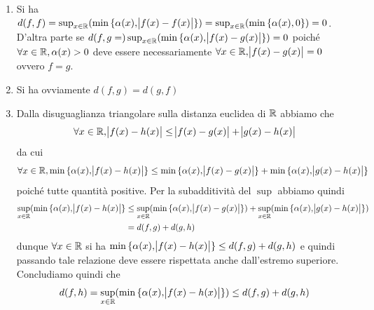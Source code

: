 \documentclass[a4paper]{article}\par \usepackage{style}\par
\begin{document}
\begin{enumerate}[label = (\roman*)]
\item Si ha $ d(f, f) = \sup_{x \in \mathbb{R}}(\min{\{\alpha(x), \abs{f(x) - f(x)}\}}) = \sup_{x \in \mathbb{R}}(\min{\{\alpha(x), 0\}}) = 0 $. D'altra parte se $ d(f, g = )\sup_{x \in \mathbb{R}}(\min{\{\alpha(x), \abs{f(x) - g(x)}\}}) = 0 $ poiché $ \forall x \in \mathbb{R}, \alpha(x) > 0 $ deve essere necessariamente $ \forall x \in \mathbb{R}, \abs{f(x) - g(x)} = 0 $ ovvero $ f = g $.
\item Si ha ovviamente $ d(f, g) = d(g, f) $
\item Dalla disuguaglianza triangolare sulla distanza euclidea di $ \mathbb{R} $ abbiamo che \[\forall x \in \mathbb{R},  \abs{f(x) - h(x)} \leq \abs{f(x) - g(x)} + \abs{g(x) - h(x)}\] da cui \[\forall x \in \mathbb{R},  \min{\{\alpha(x), \abs{f(x) - h(x)}\}} \leq \min{\{\alpha(x), \abs{f(x) - g(x)}\}} + \min{\{\alpha(x), \abs{g(x) - h(x)}\}}\] poiché tutte quantità positive. Per la subadditività del $ \sup $ abbiamo quindi
  \begin{align*}
    \sup_{x \in \mathbb{R}} (\min{\{\alpha(x), \abs{f(x) - h(x)}\}} & \leq \sup_{x \in \mathbb{R}}(\min{\{\alpha(x), \abs{f(x) - g(x)}\}}) + \sup_{x \in \mathbb{R}}(\min{\{\alpha(x), \abs{g(x) - h(x)}\}}) \\
                                                            & = d(f, g) + d(g, h)
  \end{align*}
  dunque $ \forall x \in \mathbb{R} $ si ha $ \min{\{\alpha(x), \abs{f(x) - h(x)}\}} \leq d(f, g) + d(g, h) $ e quindi passando tale relazione deve essere rispettata anche dall'estremo superiore. Concludiamo quindi che \[d(f, h) = \sup_{x \in \mathbb{R}}(\min{\{\alpha(x), \abs{f(x) - h(x)}\}}) \leq d(f, g) + d(g, h)\]
\end{enumerate}
\end{document}
